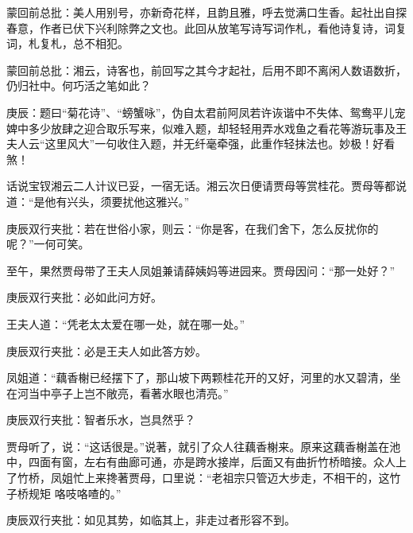 \begin{parag}

    \begin{note}蒙回前总批：美人用别号，亦新奇花样，且韵且雅，呼去觉满口生香。起社出自探春意，作者已伏下兴利除弊之文也。此回从放笔写诗写词作札，看他诗复诗，词复词，札复札，总不相犯。\end{note}
\end{parag}


\begin{parag}


    \begin{note}蒙回前总批：湘云，诗客也，前回写之其今才起社，后用不即不离闲人数语数折，仍归社中。何巧活之笔如此？\end{note}
\end{parag}


\begin{parag}


    \begin{note}庚辰：题曰“菊花诗”、“螃蟹咏”，伪自太君前阿凤若许诙谐中不失体、鸳鸯平儿宠婢中多少放肆之迎合取乐写来，似难入题，却轻轻用弄水戏鱼之看花等游玩事及王夫人云“这里风大”一句收住入题，并无纤毫牵强，此重作轻抹法也。妙极！好看煞！\end{note}
\end{parag}

\begin{parag}

    话说宝钗湘云二人计议已妥，一宿无话。湘云次日便请贾母等赏桂花。贾母等都说道：“是他有兴头，须要扰他这雅兴。”\begin{note}庚辰双行夹批：若在世俗小家，则云：“你是客，在我们舍下，怎么反扰你的呢？”一何可笑。\end{note}至午，果然贾母带了王夫人凤姐兼请薛姨妈等进园来。贾母因问：“那一处好？”\begin{note}庚辰双行夹批：必如此问方好。\end{note}王夫人道：“凭老太太爱在哪一处，就在哪一处。”\begin{note}庚辰双行夹批：必是王夫人如此答方妙。\end{note}凤姐道：“藕香榭已经摆下了，那山坡下两颗桂花开的又好，河里的水又碧清，坐在河当中亭子上岂不敞亮，看著水眼也清亮。”\begin{note}庚辰双行夹批：智者乐水，岂具然乎？\end{note}贾母听了，说：“这话很是。”说著，就引了众人往藕香榭来。原来这藕香榭盖在池中，四面有窗，左右有曲廊可通，亦是跨水接岸，后面又有曲折竹桥暗接。众人上了竹桥，凤姐忙上来搀著贾母，口里说：“老祖宗只管迈大步走，不相干的，这竹子桥规矩 咯吱咯喳的。”\begin{note}庚辰双行夹批：如见其势，如临其上，非走过者形容不到。\end{note}
\end{parag}


